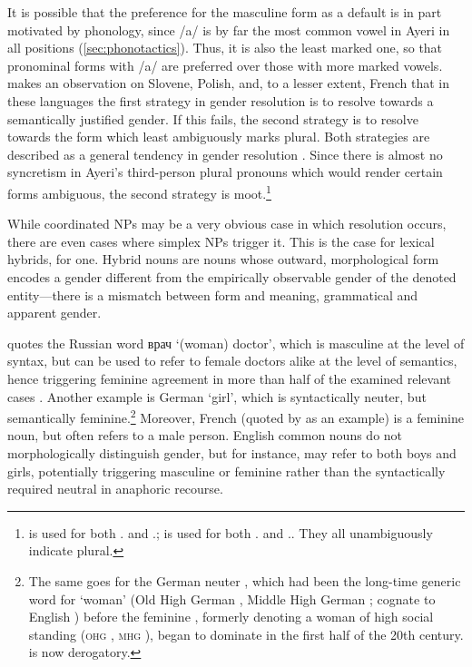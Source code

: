 It is possible that the preference for the masculine form as a default is in
part motivated by phonology, since /a/ is by far the most common vowel in Ayeri
in all positions (\autoref{sec:phonotactics}). Thus, it is also the least
marked one, so that pronominal forms with /a/ are preferred over those with
more marked vowels. \citet{corbett1983} makes an observation on Slovene,
Polish, and, to a lesser extent, French that in these languages the first
strategy in gender resolution is to resolve towards a semantically justified
gender. If this fails, the second strategy is to resolve towards the form which
least ambiguously marks plural. Both strategies are described as a general
tendency in gender resolution \citep[205]{corbett1983}. Since there is almost
no syncretism in Ayeri's third-person plural pronouns which would render
certain forms ambiguous, the second strategy is
moot.\footnote{ is used for both \TplF{}.\Aarg{} and
\TplI{}.\Aarg{};  is used for both
\TplF{}.\Gen{} and \TplI{}.\Gen{}. They all unambiguously indicate plural.}


While coordinated NPs may be a very obvious case in which resolution occurs,
there are even cases where simplex NPs trigger it. This is the case for lexical
hybrids, for one. Hybrid nouns are nouns whose outward, morphological form
encodes a gender different from the empirically observable gender of the
denoted entity---there is a mismatch between form and meaning, grammatical and
apparent gender.

\citet{corbett2006} quotes the Russian word {\FS врач}
 `(woman) doctor', which is masculine at the level of syntax, but can
be used to refer to female doctors alike at the level of semantics, hence
triggering feminine agreement in more than half of the examined relevant cases
\citep[158]{corbett2006}. Another example is German  `girl',
which is syntactically neuter, but semantically feminine.\footnote{The same
goes for the German neuter  \parencite[compare][165--166]
{fleischer2012}, which had been the long-time generic word for `woman' (Old
High German , Middle High German ; cognate to English
) before the feminine , formerly denoting a woman of high
social standing (\textsc{ohg} , \textsc{mhg} ), began to dominate in the
first half of the 20th century.  is now derogatory.} Moreover, French
 (quoted by \cite{wechsler2009} as an example) is a feminine
noun, but often refers to a male person. English common nouns do not
morphologically distinguish gender, but for instance,  may refer to
both boys and girls, potentially triggering masculine  or feminine
 rather than the syntactically required neutral  in anaphoric
recourse.

